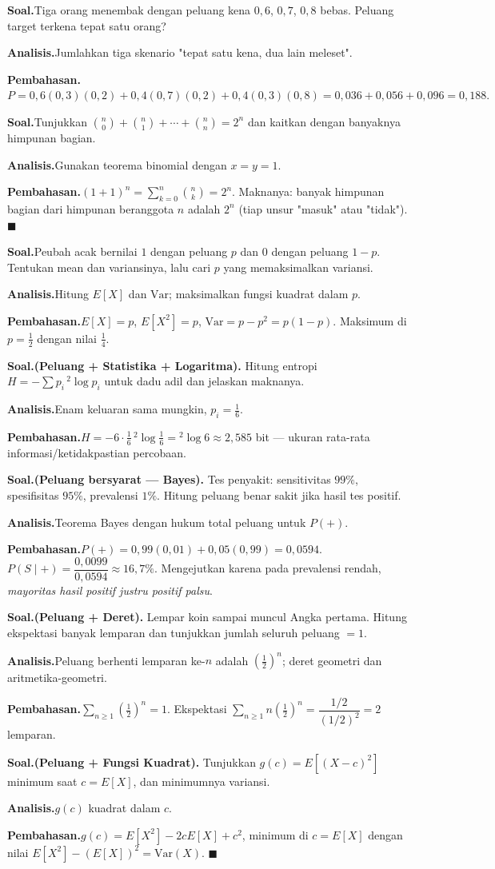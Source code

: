 \documentclass[11pt,a4paper]{report}
\theoremstyle{gaya}
\newcommand{\knomor}[1]{\par\medskip\noindent{\bfseries\color{ungu}#1}\par\nopagebreak}
\newcommand{\ksoal}{\noindent\textbf{\color{biru}Soal.}\space}
\newcommand{\kanalisis}{\par\noindent\textbf{\color{oranye}Analisis.}\space}
\newcommand{\kbahas}{\par\noindent\textbf{\color{hijau}Pembahasan.}\space}
\newcommand{\kbagian}[1]{\par\medskip\noindent{\large\bfseries\color{biru}#1}\par\smallskip}
\begin{document}
\knomor{C.3}
\ksoal Tiga orang menembak dengan peluang kena $0{,}6$, $0{,}7$, $0{,}8$ bebas. Peluang target terkena tepat satu orang?
\kanalisis Jumlahkan tiga skenario "tepat satu kena, dua lain meleset".
\kbahas $P=0{,}6(0{,}3)(0{,}2)+0{,}4(0{,}7)(0{,}2)+0{,}4(0{,}3)(0{,}8)=0{,}036+0{,}056+0{,}096=0{,}188.$

\knomor{C.4}
\ksoal Tunjukkan $\binom{n}{0}+\binom{n}{1}+\cdots+\binom{n}{n}=2^n$ dan kaitkan dengan banyaknya himpunan bagian.
\kanalisis Gunakan teorema binomial dengan $x=y=1$.
\kbahas $(1+1)^n=\sum_{k=0}^{n}\binom nk=2^n$. Maknanya: banyak himpunan bagian dari himpunan beranggota $n$ adalah $2^n$ (tiap unsur "masuk" atau "tidak"). $\blacksquare$

\knomor{C.5}
\ksoal Peubah acak bernilai $1$ dengan peluang $p$ dan $0$ dengan peluang $1-p$. Tentukan mean dan variansinya, lalu cari $p$ yang memaksimalkan variansi.
\kanalisis Hitung $E[X]$ dan $\mathrm{Var}$; maksimalkan fungsi kuadrat dalam $p$.
\kbahas $E[X]=p$, $E[X^2]=p$, $\mathrm{Var}=p-p^2=p(1-p)$. Maksimum di $p=\tfrac12$ dengan nilai $\tfrac14$.

\kbagian{Bagian D}

\knomor{D.1}
\ksoal \textbf{(Peluang + Statistika + Logaritma).} Hitung entropi $H=-\sum p_i\,{}^{2}\!\log p_i$ untuk dadu adil dan jelaskan maknanya.
\kanalisis Enam keluaran sama mungkin, $p_i=\tfrac16$.
\kbahas $H=-6\cdot\tfrac16\,{}^{2}\!\log\tfrac16={}^{2}\!\log6\approx2{,}585$ bit --- ukuran rata-rata informasi/ketidakpastian percobaan.

\knomor{D.2}
\ksoal \textbf{(Peluang bersyarat --- Bayes).} Tes penyakit: sensitivitas $99\%$, spesifisitas $95\%$, prevalensi $1\%$. Hitung peluang benar sakit jika hasil tes positif.
\kanalisis Teorema Bayes dengan hukum total peluang untuk $P(+)$.
\kbahas $P(+)=0{,}99(0{,}01)+0{,}05(0{,}99)=0{,}0594$. $P(S\mid+)=\dfrac{0{,}0099}{0{,}0594}\approx16{,}7\%.$ Mengejutkan karena pada prevalensi rendah, \emph{mayoritas hasil positif justru positif palsu}.

\knomor{D.3}
\ksoal \textbf{(Peluang + Deret).} Lempar koin sampai muncul Angka pertama. Hitung ekspektasi banyak lemparan dan tunjukkan jumlah seluruh peluang $=1$.
\kanalisis Peluang berhenti lemparan ke-$n$ adalah $(\tfrac12)^n$; deret geometri dan aritmetika-geometri.
\kbahas $\sum_{n\ge1}(\tfrac12)^n=1$. Ekspektasi $\sum_{n\ge1}n(\tfrac12)^n=\dfrac{1/2}{(1/2)^2}=2$ lemparan.

\knomor{D.4}
\ksoal \textbf{(Peluang + Fungsi Kuadrat).} Tunjukkan $g(c)=E[(X-c)^2]$ minimum saat $c=E[X]$, dan minimumnya variansi.
\kanalisis $g(c)$ kuadrat dalam $c$.
\kbahas $g(c)=E[X^2]-2cE[X]+c^2$, minimum di $c=E[X]$ dengan nilai $E[X^2]-(E[X])^2=\mathrm{Var}(X)$. $\blacksquare$
\end{document}
